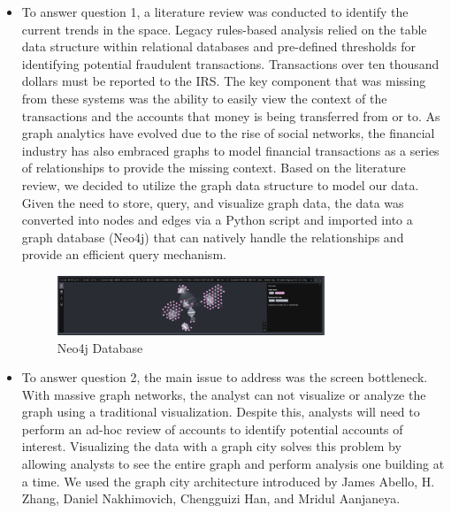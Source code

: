\vspace{\baselineskip} 
\begin{itemize} 
\item To answer question 1, a literature review was conducted to identify the current trends in the space. Legacy rules-based analysis relied on the table data structure within relational databases and pre-defined thresholds for identifying potential fraudulent
transactions. Transactions over ten thousand dollars must be reported to the IRS. The key component that was missing from these systems was the ability to easily view the context of the transactions and the accounts that money is being transferred from or to.
As graph analytics\cite{GraphAnalytics} have evolved due to the rise of social networks, the financial industry has also embraced graphs to model financial transactions as a series of relationships to provide the missing context. Based on the literature review, we decided to utilize the graph data structure to model our data. Given the need to store, query, and visualize graph data, the data was converted
\cite{Neo4j}into nodes and edges via a Python script and imported into a graph database (Neo4j) that can natively handle the relationships and provide an efficient query mechanism.


\begin{figure}[H]
\begin{center}
    \includegraphics[width=8cm]{imgs/neo4j.png}
    \caption{Neo4j Database}
    \centering
\end{center}
\end{figure}

\item To answer question 2, the main issue to address was the screen bottleneck. With massive graph networks, the analyst can not visualize or analyze the graph using a traditional visualization. Despite this, analysts will need to perform an ad-hoc review of accounts to identify potential accounts of interest. Visualizing the data with a graph city solves this problem by allowing analysts to
see the entire graph and perform analysis one building at a time. We used the graph city architecture introduced by James Abello, H. Zhang, Daniel Nakhimovich, Chengguizi Han, and Mridul Aanjaneya.\cite{Abello2022GigaGC}\cite{Abello2021GraphCT}\cite{Abello2020GraphW}\cite{Abello2013FixedPO}


\end{itemize}
